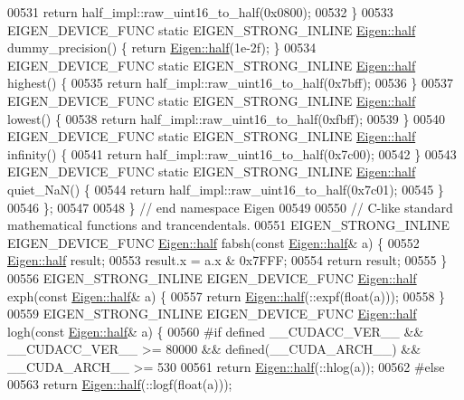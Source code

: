 \begin{DoxyCode}
00531     \textcolor{keywordflow}{return} half\_impl::raw\_uint16\_to\_half(0x0800);
00532   \}
00533   EIGEN\_DEVICE\_FUNC \textcolor{keyword}{static} EIGEN\_STRONG\_INLINE \hyperlink{struct_eigen_1_1half}{Eigen::half} dummy\_precision() \{ \textcolor{keywordflow}{return} 
      \hyperlink{struct_eigen_1_1half}{Eigen::half}(1e-2f); \}
00534   EIGEN\_DEVICE\_FUNC \textcolor{keyword}{static} EIGEN\_STRONG\_INLINE \hyperlink{struct_eigen_1_1half}{Eigen::half} highest() \{
00535     \textcolor{keywordflow}{return} half\_impl::raw\_uint16\_to\_half(0x7bff);
00536   \}
00537   EIGEN\_DEVICE\_FUNC \textcolor{keyword}{static} EIGEN\_STRONG\_INLINE \hyperlink{struct_eigen_1_1half}{Eigen::half} lowest() \{
00538     \textcolor{keywordflow}{return} half\_impl::raw\_uint16\_to\_half(0xfbff);
00539   \}
00540   EIGEN\_DEVICE\_FUNC \textcolor{keyword}{static} EIGEN\_STRONG\_INLINE \hyperlink{struct_eigen_1_1half}{Eigen::half} infinity() \{
00541     \textcolor{keywordflow}{return} half\_impl::raw\_uint16\_to\_half(0x7c00);
00542   \}
00543   EIGEN\_DEVICE\_FUNC \textcolor{keyword}{static} EIGEN\_STRONG\_INLINE \hyperlink{struct_eigen_1_1half}{Eigen::half} quiet\_NaN() \{
00544     \textcolor{keywordflow}{return} half\_impl::raw\_uint16\_to\_half(0x7c01);
00545   \}
00546 \};
00547 
00548 \} \textcolor{comment}{// end namespace Eigen}
00549 
00550 \textcolor{comment}{// C-like standard mathematical functions and trancendentals.}
00551 EIGEN\_STRONG\_INLINE EIGEN\_DEVICE\_FUNC \hyperlink{struct_eigen_1_1half}{Eigen::half} fabsh(\textcolor{keyword}{const} 
      \hyperlink{struct_eigen_1_1half}{Eigen::half}& a) \{
00552   \hyperlink{struct_eigen_1_1half}{Eigen::half} result;
00553   result.x = a.x & 0x7FFF;
00554   \textcolor{keywordflow}{return} result;
00555 \}
00556 EIGEN\_STRONG\_INLINE EIGEN\_DEVICE\_FUNC \hyperlink{struct_eigen_1_1half}{Eigen::half} exph(\textcolor{keyword}{const} 
      \hyperlink{struct_eigen_1_1half}{Eigen::half}& a) \{
00557   \textcolor{keywordflow}{return} \hyperlink{struct_eigen_1_1half}{Eigen::half}(::expf(\textcolor{keywordtype}{float}(a)));
00558 \}
00559 EIGEN\_STRONG\_INLINE EIGEN\_DEVICE\_FUNC \hyperlink{struct_eigen_1_1half}{Eigen::half} logh(\textcolor{keyword}{const} 
      \hyperlink{struct_eigen_1_1half}{Eigen::half}& a) \{
00560 \textcolor{preprocessor}{#if defined \_\_CUDACC\_VER\_\_ && \_\_CUDACC\_VER\_\_ >= 80000 && defined(\_\_CUDA\_ARCH\_\_) && \_\_CUDA\_ARCH\_\_ >= 530}
00561   \textcolor{keywordflow}{return} \hyperlink{struct_eigen_1_1half}{Eigen::half}(::hlog(a));
00562 \textcolor{preprocessor}{#else}
00563   \textcolor{keywordflow}{return} \hyperlink{struct_eigen_1_1half}{Eigen::half}(::logf(\textcolor{keywordtype}{float}(a)));

\end{DoxyCode}
